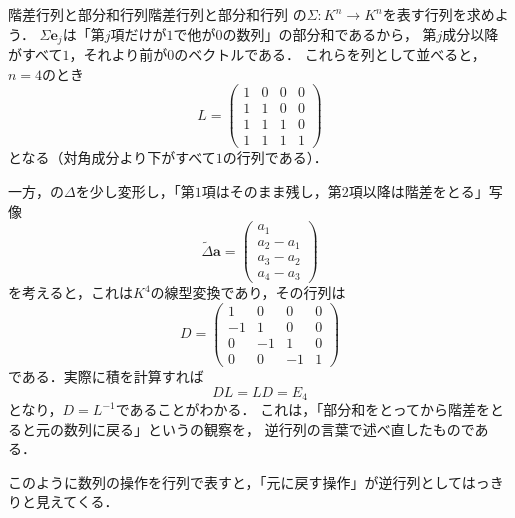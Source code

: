 \begin{example}{階差行列と部分和行列}{階差行列と部分和行列}
  の$\Sigma \colon K^n \to K^n$を表す行列を求めよう．
  $\Sigma \bm{e}_j$は「第$j$項だけが$1$で他が$0$の数列」の部分和であるから，
  第$j$成分以降がすべて$1$，それより前が$0$のベクトルである．
  これらを列として並べると，$n = 4$のとき
  \[
    L =
    \begin{pmatrix}
      1 & 0 & 0 & 0 \\
      1 & 1 & 0 & 0 \\
      1 & 1 & 1 & 0 \\
      1 & 1 & 1 & 1
    \end{pmatrix}
  \]
  となる（対角成分より下がすべて$1$の行列である）．

  一方，の$\Delta$を少し変形し，「第$1$項はそのまま残し，第$2$項以降は階差をとる」写像
  \[
    \widetilde{\Delta} \bm{a} =
    \begin{pmatrix} a_1 \\ a_2 - a_1 \\ a_3 - a_2 \\ a_4 - a_3 \end{pmatrix}
  \]
  を考えると，これは$K^4$の線型変換であり，その行列は
  \[
    D =
    \begin{pmatrix}
      1 & 0 & 0 & 0 \\
      -1 & 1 & 0 & 0 \\
      0 & -1 & 1 & 0 \\
      0 & 0 & -1 & 1
    \end{pmatrix}
  \]
  である．実際に積を計算すれば
  \[
    DL = LD = E_4
  \]
  となり，$D = L^{-1}$であることがわかる．
  これは，「部分和をとってから階差をとると元の数列に戻る」というの観察を，
  逆行列の言葉で述べ直したものである．
\end{example}

このように数列の操作を行列で表すと，「元に戻す操作」が逆行列としてはっきりと見えてくる．

